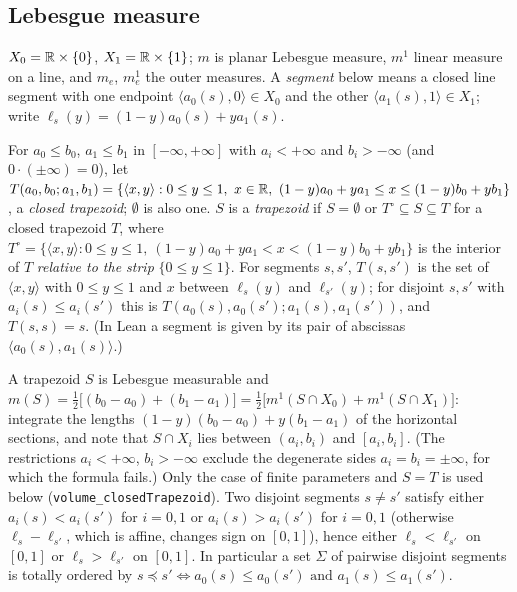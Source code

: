 \subsection{Lebesgue measure}
$X_0=\mathbb{R}\times\{0\}$, $X_1=\mathbb{R}\times\{1\}$; $m$ is planar Lebesgue measure, $m^1$ linear measure on a line, and $m_e$, $m^1_e$
the outer measures. A \emph{segment} below means a closed line segment with one endpoint $\langle a_0(s),0\rangle\in X_0$ and the
other $\langle a_1(s),1\rangle\in X_1$; write $\ell_s(y)=(1-y)a_0(s)+ya_1(s)$.

\begin{definition}[trapezoids]\label{def:trapezoid}
For $a_0\le b_0$, $a_1\le b_1$ in $[-\infty,+\infty]$ with $a_i<+\infty$ and $b_i>-\infty$ (and $0\cdot(\pm\infty)=0$), let
$T(a_0,b_0;a_1,b_1)=\{\langle x,y\rangle:0\le y\le1,\ x\in\mathbb{R},\ (1-y)a_0+ya_1\le x\le(1-y)b_0+yb_1\}$, a \emph{closed trapezoid}; $\emptyset$
is also one. $S$ is a \emph{trapezoid} if $S=\emptyset$ or $T^\circ\subseteq S\subseteq T$ for a closed trapezoid $T$, where
$T^\circ=\{\langle x,y\rangle:0\le y\le1,\ (1-y)a_0+ya_1<x<(1-y)b_0+yb_1\}$ is the interior of $T$ \emph{relative to the strip}
$\{0\le y\le1\}$. For segments $s,s'$, $T(s,s')$ is the set of $\langle x,y\rangle$ with $0\le y\le1$ and $x$ between $\ell_s(y)$
and $\ell_{s'}(y)$; for disjoint $s,s'$ with $a_i(s)\le a_i(s')$ this is $T(a_0(s),a_0(s');a_1(s),a_1(s'))$, and $T(s,s)=s$.
(In Lean a segment is given by its pair of abscissas $\langle a_0(s),a_1(s)\rangle$.)
\end{definition}
A trapezoid $S$ is Lebesgue measurable and
$m(S)=\frac12\bigl[(b_0-a_0)+(b_1-a_1)\bigr]=\frac12\bigl[m^1(S\cap X_0)+m^1(S\cap X_1)\bigr]$: integrate the lengths
$(1-y)(b_0-a_0)+y(b_1-a_1)$ of the horizontal sections, and note that $S\cap X_i$ lies between $(a_i,b_i)$ and $[a_i,b_i]$.
(The restrictions $a_i<+\infty$, $b_i>-\infty$ exclude the degenerate sides $a_i=b_i=\pm\infty$, for which the formula fails.)
Only the case of finite parameters and $S=T$ is used below (\texttt{volume\_closedTrapezoid}). Two disjoint segments $s\ne s'$
satisfy either $a_i(s)<a_i(s')$ for $i=0,1$ or $a_i(s)>a_i(s')$ for $i=0,1$ (otherwise $\ell_s-\ell_{s'}$, which is affine, changes sign
on $[0,1]$), hence either $\ell_s<\ell_{s'}$ on $[0,1]$ or $\ell_s>\ell_{s'}$ on $[0,1]$. In particular a set $\Sigma$ of pairwise
disjoint segments is totally ordered by $s\preceq s'\iff a_0(s)\le a_0(s')\text{ and }a_1(s)\le a_1(s')$.

